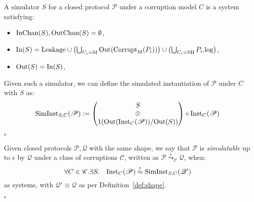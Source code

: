 \begin{definition}
  A simulator $S$ for a closed protocol $\mathscr{P}$ under a corruption
  model $C$ is a system satisfying:
  \begin{itemize}
    \item $\text{InChan}(S), \text{OutChan}(S) = \emptyset$,
    \item $\text{In}(S) = \text{Leakage} \cup \left(\bigcup_{C_i = \text{M}} \text{Out}(\text{Corrupt}_{\text{M}}(P_i))\right) \cup \left(\bigcup_{C_i = \text{SH}} P_i.\text{log}\right)$,
    \item $\text{Out}(S) = \text{In}(S)$,
  \end{itemize}

  Given such a simulator, we can define the simulated instantiation
  of $\mathscr{P}$ under $C$ with $S$ as:
  $$
  \text{SimInst}_{S, C}(\mathscr{P}) := 
  \begin{pmatrix}
    S\cr
    \otimes\cr
    1(\text{Out}(\text{Inst}_C(\mathscr{P})) / \text{Out}(S))
  \end{pmatrix}
  \circ \text{Inst}_C(\mathscr{P})
  $$

  $\square$
\end{definition}

\begin{definition}[Simulatability]
  Given closed protocols $\mathscr{P}, \mathscr{Q}$ with the same shape,
  we say that $\mathscr{P}$ is \emph{simulatable} up to $\epsilon$ by $\mathscr{Q}$
  under a class of corruptions $\mathscr{C}$,
  written as $\mathscr{P} \overset{\epsilon}{\leadsto}_{\mathscr{C}} \mathscr{Q}$,
  when:
  $$
  \forall C \in \mathscr{C}.\exists S.\quad \text{Inst}_C(\mathscr{P}) \overset{\epsilon}{\approx} \text{SimInst}_{S, C}(\mathscr{Q}')
  $$
  as systems, with $\mathscr{Q}' \equiv \mathscr{Q}$ as per 
  Definition~\ref{def:shape}.

  $\square$
\end{definition}

